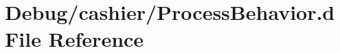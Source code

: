 \hypertarget{ProcessBehavior_8d}{\section{Debug/cashier/\-Process\-Behavior.d File Reference}
\label{ProcessBehavior_8d}
}
